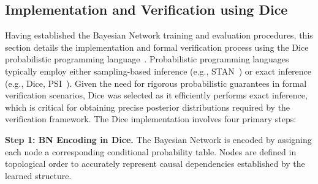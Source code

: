 \documentclass{vgtc}                          %
\begin{document}




\subsection{Implementation and Verification using Dice}\label{sec:Dice}
Having established the Bayesian Network training and evaluation procedures, this section details the implementation and formal verification process using the Dice probabilistic programming language~\cite{dice}. Probabilistic programming languages typically employ either sampling-based inference (e.g., STAN~\cite{carpenter2017stan}) or exact inference (e.g., Dice, PSI~\cite{psi}). Given the need for rigorous probabilistic guarantees in formal verification scenarios, Dice was selected as it efficiently performs exact inference, which is critical for obtaining precise posterior distributions required by the verification framework. The Dice implementation involves four primary steps:

\vspace{1pt}
\noindent\textbf{Step 1: BN Encoding in Dice.}
The Bayesian Network is encoded by assigning each node a corresponding conditional probability table. Nodes are defined in topological order to accurately represent causal dependencies established by the learned structure.
\vspace{1pt}
\end{document}
